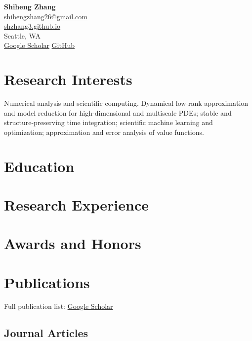 \documentclass[11pt]{article}
\newcommand{\mytitle}[4]{
  \begin{center}
    {\Large\textbf{#1}}\\
    \href{mailto:#2}{#2}\\
    \href{https://#3}{#3}\\
    #4
  \end{center}
}
\begin{document}
\mytitle
  {Shiheng Zhang}
  {shihengzhang26@gmail.com}
  {shzhang3.github.io}
  {Seattle, WA\\\href{https://scholar.google.com/citations?user=hKh5DZcAAAAJ&hl=en}{Google Scholar} \textbar{} \href{https://github.com/shzhang3}{GitHub}}

\RaggedRight

\section*{Research Interests}
Numerical analysis and scientific computing. Dynamical low-rank approximation and model reduction for high-dimensional and multiscale PDEs; stable and structure-preserving time integration; scientific machine learning and optimization; approximation and error analysis of value functions.

\section*{Education}


\section*{Research Experience}


\section*{Awards and Honors}


\newpage
{}
\section*{Publications}
\small Full publication list: \href{https://scholar.google.com/citations?user=hKh5DZcAAAAJ&hl=en}{Google Scholar}
\normalsize

\nocite{*}

\subsection*{Journal Articles}
\newrefcontext[sorting=cv-journal,labelprefix=J]
\printbibliography[
  type=article,
  heading=none,
  resetnumbers=true,
  keyword=J
]
\end{document}
